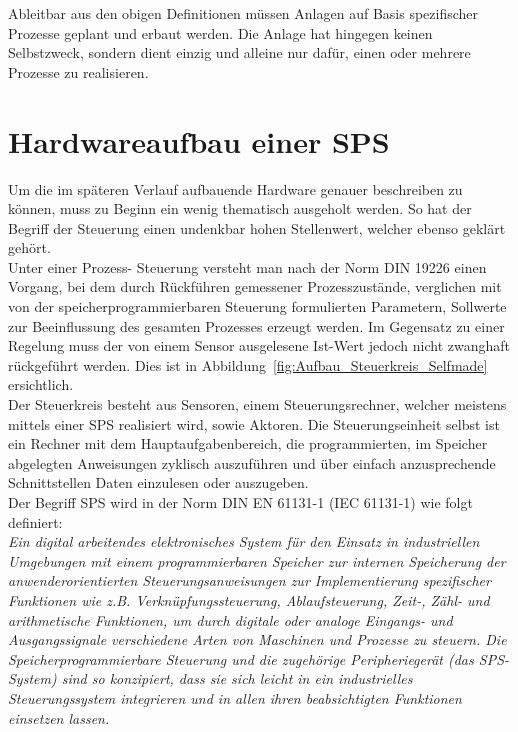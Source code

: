	Ableitbar aus den obigen Definitionen müssen Anlagen auf Basis spezifischer Prozesse geplant und erbaut werden. Die Anlage hat hingegen keinen Selbstzweck, sondern dient einzig und alleine nur dafür, einen oder mehrere Prozesse zu realisieren.\\

	\section{Hardwareaufbau einer \ac{SPS}}
	
	Um die im späteren Verlauf aufbauende Hardware genauer beschreiben zu können, muss zu Beginn ein wenig thematisch ausgeholt werden. So hat der Begriff der Steuerung einen undenkbar hohen Stellenwert, welcher ebenso geklärt gehört.\\

	Unter einer Prozess- Steuerung versteht man nach der Norm \acs{DIN} 19226 einen Vorgang, bei dem durch Rückführen gemessener Prozesszustände, verglichen mit von der speicherprogrammierbaren Steuerung formulierten Parametern, Sollwerte zur Beeinflussung des gesamten Prozesses erzeugt werden. Im Gegensatz zu einer Regelung muss der von einem Sensor ausgelesene Ist-Wert jedoch nicht zwanghaft rückgeführt werden. Dies ist in Abbildung~\ref{fig:Aufbau_Steuerkreis_Selfmade} ersichtlich.\cite{mseitz_sps}\\
	
	Der Steuerkreis besteht aus Sensoren, einem Steuerungsrechner, welcher meistens mittels einer \ac{SPS} realisiert wird, sowie Aktoren. Die Steuerungseinheit selbst ist ein Rechner mit dem Hauptaufgabenbereich, die programmierten, im Speicher abgelegten Anweisungen zyklisch auszuführen und über einfach anzusprechende Schnittstellen Daten einzulesen oder auszugeben. \cite{mseitz_sps} \\
	
	Der Begriff \ac{SPS} wird in der Norm \acs{DIN} \acs{EN} 61131-1 (\acs{IEC} 61131-1) wie folgt definiert:\cite{mseitz_sps} \\
	
	\glqq \textit{Ein digital arbeitendes elektronisches System für den Einsatz in industriellen Umgebungen mit einem programmierbaren Speicher zur internen Speicherung der anwenderorientierten Steuerungsanweisungen zur Implementierung spezifischer Funktionen wie z.B. Verknüpfungssteuerung, Ablaufsteuerung, Zeit-, Zähl- und arithmetische Funktionen, um durch digitale oder analoge Eingangs- und Ausgangssignale verschiedene Arten von Maschinen und Prozesse zu steuern. Die Speicherprogrammierbare Steuerung und die zugehörige Peripheriegerät (das \ac{SPS}- System) sind so konzipiert, dass sie sich leicht in ein industrielles Steuerungssystem integrieren und in allen ihren beabsichtigten Funktionen einsetzen lassen.}\grqq \space \cite{sps_programmierung}\\
 
